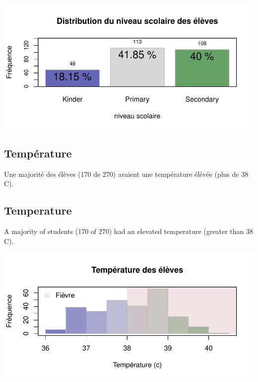 \documentclass[11pt]{article}
\begin{document}
\begin{center}
\includegraphics{chik_analyse_pour_madsen-005}
\end{center}
\begin{multicols}{2} 



\subsection*{Température}
Une majorité des élèves (170 de 270) avaient une température élévée (plus de 38 C).

\vfill
\columnbreak

\subsection*{Temperature}
A majority of students (170 of 270) had an elevated temperature (greater than 38 C).

\end{multicols}
\begin{center}
\includegraphics{chik_analyse_pour_madsen-006}
\end{center}
\end{document}
